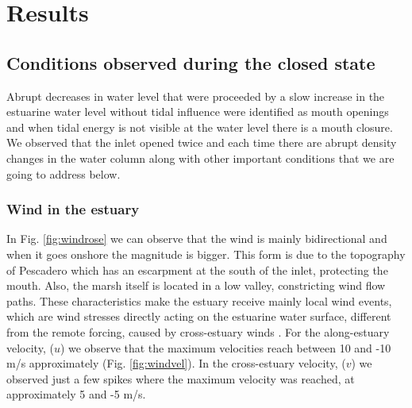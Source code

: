 \documentclass[tesis.tex]{subfiles}
\begin{document}
    
\section{Results}

\subsection{Conditions observed during the closed state}

Abrupt decreases in water level that were proceeded by a slow increase in the estuarine water level without tidal influence were identified as mouth openings and when tidal energy is not visible at the water level there is a mouth closure. We observed that the inlet opened twice and each time there are abrupt density changes in the water column along with other important conditions that we are going to address below.

\subsubsection{Wind in the estuary}

In Fig. \ref{fig:windrose} we can observe that the wind is mainly bidirectional and when it goes onshore the magnitude is bigger. This form is due to the topography of Pescadero which has an escarpment at the south of the inlet, protecting the mouth. Also, the marsh itself is located in a low valley, constricting wind flow paths. These characteristics make the estuary receive mainly local wind events, which are wind stresses directly acting on the estuarine water surface, different from the remote forcing, caused by cross-estuary winds \citep{payandeh2019subtidal}. For the along-estuary velocity, ($u$) we observe that the maximum velocities reach between 10 and -10 m/s approximately (Fig. \ref{fig:windvel}). In the cross-estuary velocity, ($v$) we observed just a few spikes where the maximum velocity was reached, at approximately 5 and -5 m/s. 
\end{document}
